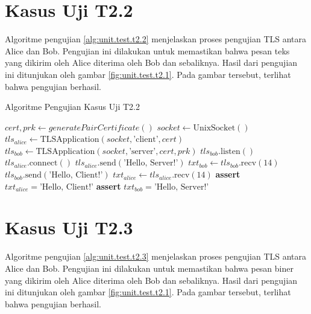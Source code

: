 \section{Kasus Uji T2.2}

Algoritme pengujian \ref{alg:unit.test.t2.2} menjelaskan proses pengujian TLS antara Alice dan Bob. Pengujian ini dilakukan untuk memastikan bahwa pesan teks yang dikirim oleh Alice diterima oleh Bob dan sebaliknya. Hasil dari pengujian ini ditunjukan oleh gambar \ref{fig:unit.test.t2.1}. Pada gambar tersebut, terlihat bahwa pengujian berhasil.

\begin{algorithm}
  \caption{Algoritme Pengujian Kasus Uji T2.2}
  \label{alg:unit.test.t2.2}
  \begin{algorithmic}
    \State $cert, prk \gets generatePairCertificate()$
    \State $socket \gets \text{UnixSocket}()$ 
    \State $tls_{alice} \gets \text{TLSApplication}(socket, \text{'client'}, cert)$ 
    \State $tls_{bob} \gets \text{TLSApplication}(socket, \text{'server'}, cert, prk)$
    \State
    \State $tls_{bob}.\text{listen}()$  
    \State $tls_{alice}.\text{connect}()$  
    \State
    \State $tls_{alice}.\text{send}(\text{'Hello, Server!'})$
    \State $txt_{bob} \gets tls_{bob}.\text{recv}(14)$
    \State
    \State $tls_{bob}.\text{send}(\text{'Hello, Client!'})$
    \State $txt_{alice} \gets tls_{alice}.\text{recv}(14)$
    \State
    \State \textbf{assert} $txt_{alice} = \text{'Hello, Client!'}$
    \State \textbf{assert} $txt_{bob} = \text{'Hello, Server!'}$
  \end{algorithmic}
\end{algorithm}

\section{Kasus Uji T2.3}

Algoritme pengujian \ref{alg:unit.test.t2.3} menjelaskan proses pengujian TLS antara Alice dan Bob. Pengujian ini dilakukan untuk memastikan bahwa pesan biner yang dikirim oleh Alice diterima oleh Bob dan sebaliknya. Hasil dari pengujian ini ditunjukan oleh gambar \ref{fig:unit.test.t2.1}. Pada gambar tersebut, terlihat bahwa pengujian berhasil.

